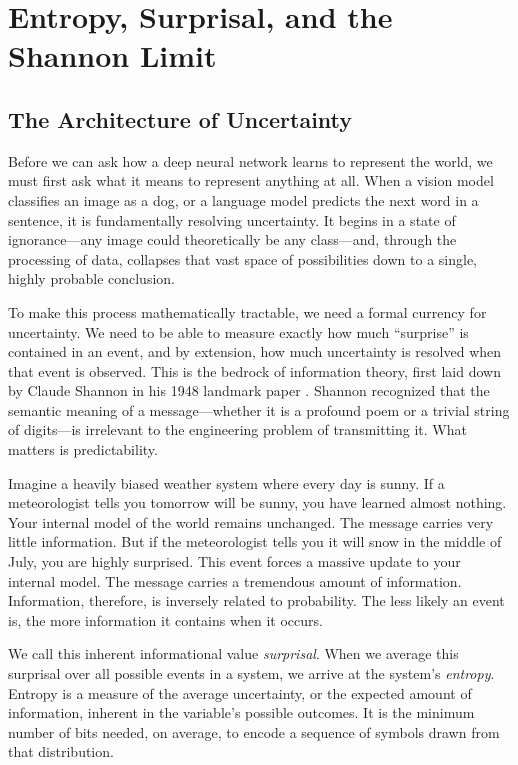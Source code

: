\chapter{Entropy, Surprisal, and the Shannon Limit}
\label{ch:entropy}

\section{The Architecture of Uncertainty}

Before we can ask how a deep neural network learns to represent the world, we must first ask what it means to represent anything at all. When a vision model classifies an image as a dog, or a language model predicts the next word in a sentence, it is fundamentally resolving uncertainty. It begins in a state of ignorance---any image could theoretically be any class---and, through the processing of data, collapses that vast space of possibilities down to a single, highly probable conclusion. 

To make this process mathematically tractable, we need a formal currency for uncertainty. We need to be able to measure exactly how much ``surprise'' is contained in an event, and by extension, how much uncertainty is resolved when that event is observed. This is the bedrock of information theory, first laid down by Claude Shannon in his 1948 landmark paper \cite{shannon1948mathematical}. Shannon recognized that the semantic meaning of a message---whether it is a profound poem or a trivial string of digits---is irrelevant to the engineering problem of transmitting it. What matters is predictability.

Imagine a heavily biased weather system where every day is sunny. If a meteorologist tells you tomorrow will be sunny, you have learned almost nothing. Your internal model of the world remains unchanged. The message carries very little information. But if the meteorologist tells you it will snow in the middle of July, you are highly surprised. This event forces a massive update to your internal model. The message carries a tremendous amount of information. Information, therefore, is inversely related to probability. The less likely an event is, the more information it contains when it occurs.

We call this inherent informational value \textit{surprisal}. When we average this surprisal over all possible events in a system, we arrive at the system's \textit{entropy}. Entropy is a measure of the average uncertainty, or the expected amount of information, inherent in the variable's possible outcomes. It is the minimum number of bits needed, on average, to encode a sequence of symbols drawn from that distribution. 

